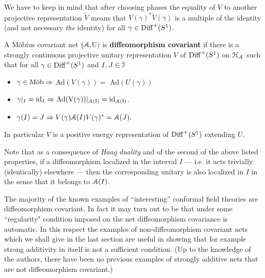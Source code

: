 \documentclass[12pt]{article}
\begin{document}
We have to keep in mind that after choosing phases the equality
of $V$ to another projective representation
$\tilde{V}$ means that $V(\gamma)^*\tilde{V}(\gamma)$ is a
multiple of the identity (and not necessary {\it the} identity) 
for all $\gamma \in {{\rm Diff}^+(S^1)}$.

\begin{definition}
\label{diffcov:def}
A M\"obius covariant net $({\mathcal A},$U$)$ is {\bf diffeomorphism
covariant} if there is a strongly continuous projective 
unitary representation 
$V$ of ${{\rm Diff}^+(S^1)}$ on ${\mathcal H}_{\mathcal A}$ such that for all 
$\gamma \in {{\rm Diff}^+(S^1)}$ and $I,J \in {\mathcal I}$ 
\begin{itemize} 
\item[1.]
$\gamma \in \text {M\"{o}b} \Rightarrow $ Ad$(V(\gamma)) = $ Ad$(U(\gamma))$
\item[2.]
$\gamma|_I={\rm{id}}_I \Rightarrow
\rm{Ad}(V(\gamma))|_{{\mathcal A}(I)}=\rm{id}_{{\mathcal A}(I)}$.
\item[3.]
$\gamma(I)=J \Rightarrow V(\gamma){\mathcal A}(I)V(\gamma)^* = {\mathcal A}(J).$
\end{itemize}  
In particular $V$ is a positive energy representation of ${{\rm Diff}^+(S^1)}$ extending 
$U$. 
\end{definition}

Note that as a consequence of {\it Haag duality} and of the second 
of the above listed properties, if a diffeomorphism localized in
the interval $I$ --- i.e. it acts trivially (identically) elsewhere ---
then the corresponding unitary is also localized in $I$ in the sense that
it belongs to ${\mathcal A}(I)$.
 
The majority of the known examples of ``interesting'' conformal field
theories are diffeomorphism covariant. In fact it may turn out to be that
under some ``regularity" condition imposed on the net diffeomorphism
covariance is automatic. In this respect the examples of
non-diffeomorphism covariant
nets which we shall give in the last section are useful in showing that
for example strong additivity in itself is not a sufficient condition. (Up
to the knowledge of the authors, there have been no previous examples of
strongly additive nets that are not diffeomorphism covariant.)
\end{document}
